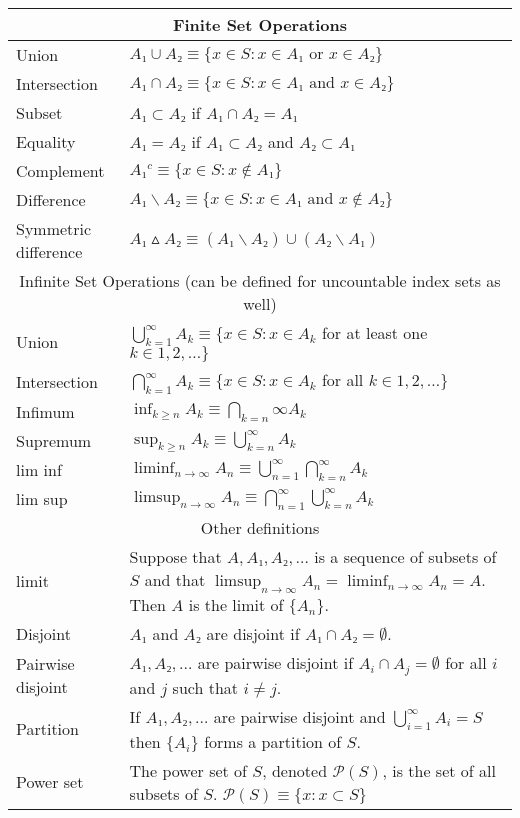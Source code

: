 \begin{fullwidth}
\begin{tabular}{lp{4in}}
  \toprule
  \multicolumn{2}{c}{Finite Set Operations} \\
  \midrule
  Union        & $A₁ ∪ A₂ ≡ \{x ∈ S : x ∈ A₁ \text{ or } x∈ A₂\}$ \\
  Intersection & $A₁ ∩ A₂ ≡ \{x ∈ S : x ∈ A₁ \text{ and } x ∈ A₂\}$ \\
  Subset       & $A₁ ⊂ A₂$ if $A₁ ∩ A₂ = A₁$ \\
  Equality     & $A₁ = A₂$ if $A₁ ⊂ A₂$ and $A₂ ⊂ A₁$ \\
  Complement   & $A₁^c ≡ \{x ∈ S : x ∉ A₁\}$ \\
  Difference   & $A₁ ∖ A₂ ≡ \{x ∈ S : x ∈ A₁ \text{ and } x ∉ A₂\}$ \\
  Symmetric difference & $A₁ ▵ A₂ ≡ (A₁ ∖ A₂) ∪ (A₂ ∖ A₁)$ \\
  \midrule
  \multicolumn{2}{c}{Infinite Set Operations (can be defined for uncountable index sets as well)} \\
  \midrule
  Union        & $⋃_{k=1}^∞ A_k ≡ \{x ∈ S : x ∈ A_k$ for at least one $k ∈ 1,2,…\}$ \\
  Intersection & $⋂_{k=1}^∞ A_k ≡ \{x ∈ S : x ∈ A_k$ for all $k ∈ 1,2,…\}$ \\
  Infimum      & $\inf_{k ≥ n} A_k ≡ ⋂_{k=n}∞ A_k$ \\
  Supremum     & $\sup_{k ≥ n} A_k ≡ ⋃_{k=n}^∞ A_k$ \\
  lim inf      & $\liminf_{n → ∞} A_n ≡ ⋃_{n=1}^∞ ⋂_{k=n}^∞ A_k$ \\
  lim sup      & $\limsup_{n → ∞} A_n ≡ ⋂_{n=1}^∞ ⋃_{k=n}^∞ A_k$ \\
  \midrule
  \multicolumn{2}{c}{Other definitions} \\
  \midrule
  limit 
  & Suppose that $A, A₁, A₂, …$ is a sequence of subsets of $S$ and that $\limsup_{n → ∞} A_n = \liminf_{n → ∞} A_n = A$.
  Then $A$ is the limit of $\{A_n\}$. \\
  Disjoint 
  & $A₁$ and $A₂$ are disjoint if $A₁ ∩ A₂ = ∅$. \\
  Pairwise disjoint 
  & $A₁, A₂, …$ are pairwise disjoint if $A_i ∩ A_j = ∅$ for all $i$ and $j$ such that $i ≠ j$. \\
  Partition & If $A₁,A₂,…$ are pairwise disjoint and $⋃_{i=1}^∞ A_i = S$ then $\{A_i\}$ forms a partition of $S$. \\
  Power set & The power set of $S$, denoted $\mathcal{P}(S)$, is the set of all subsets of $S$.
  $\mathcal{P}(S) ≡ \{x : x ⊂ S\}$ \\
\bottomrule
\end{tabular}
\end{fullwidth}

